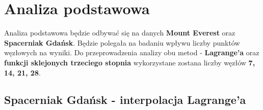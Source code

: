 \documentclass{article}
\begin{document}
\clearpage
\section{Analiza podstawowa}

Analiza podstawowa będzie odbywać się na danych \textbf{Mount Everest} oraz \textbf{Spacerniak Gdańsk}. Będzie polegała na badaniu wpływu liczby punktów węzłowych na wyniki. Do przeprowadzenia analizy obu metod - \textbf{Lagrange'a} oraz \textbf{funkcji sklejonych trzeciego stopnia} wykorzystane zostana liczby węzłów \textbf{7, 14, 21, 28}.

\subsection{Spacerniak Gdańsk - interpolacja Lagrange'a}
\end{document}
